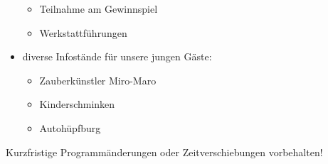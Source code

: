 \begin{itemize}
  \begin{itemize}
  \item
    Teilnahme am Gewinnspiel
  \item
    Werkstattführungen
  \end{itemize}
\item
  diverse Infostände für unsere jungen Gäste:

  \begin{itemize}
  \item
    Zauberkünstler Miro-Maro
  \item
    Kinderschminken
  \item
    Autohüpfburg
  \end{itemize}
\end{itemize}

Kurzfristige Programmänderungen oder Zeitverschiebungen vorbehalten!
